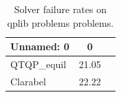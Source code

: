 \begin{table}
\caption{Solver failure rates on qplib problems problems.}
\label{t-qplib problems-failure}
\begin{tabular}{lcc}
\toprule
Unnamed: 0 & 0 \\
\midrule
QTQP_equil & 21.05 \\
Clarabel & 22.22 \\
\bottomrule
\end{tabular}
\end{table}
